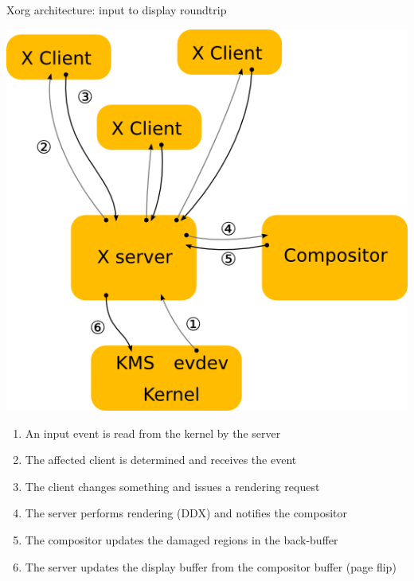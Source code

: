 \begin{frame}{Xorg architecture: input to display roundtrip}
  \begin{minipage}{0.49\textwidth}
    \centering
    \includegraphics[height=0.8\textwidth]{slides/graphics-software/x-architecture-roundtrip.png}
  \end{minipage}
  \hfill
  \begin{minipage}{0.49\textwidth}
    \begin{enumerate}
    \item An input event is read from the kernel by the server
    \item The affected client is determined and receives the event
    \item The client changes something and issues a rendering request
    \item The server performs rendering (DDX) and notifies the compositor
    \item The compositor updates the damaged regions in the back-buffer
    \item The server updates the display buffer from the compositor buffer (page flip)
    \end{enumerate}
  \end{minipage}
\end{frame}

